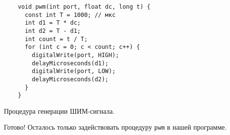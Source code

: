 \documentclass[../sparc.tex]{subfiles}
\begin{document}
\begin{listing}[H]
  \begin{verbatim}
    void pwm(int port, float dc, long t) {
      const int T = 1000; // мкс
      int d1 = T * dc;
      int d2 = T - d1;
      int count = t / T;
      for (int c = 0; c < count; c++) {
        digitalWrite(port, HIGH);
        delayMicroseconds(d1);
        digitalWrite(port, LOW);
        delayMicroseconds(d2);
      }
    }
  \end{verbatim}
  \label{listing:pwm-procedure}
  \caption{Процедура генерации ШИМ-сигнала.}
\end{listing}

Готово! Осталось только задействовать процедуру \texttt{pwm} в нашей программе.
\end{document}
